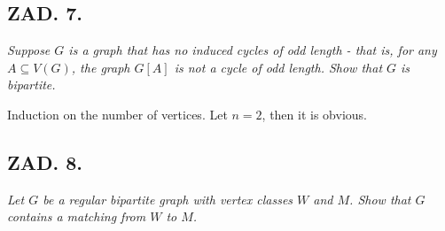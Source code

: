 \documentclass{article}[13pt]
\begin{document}
\subsection*{ZAD. 7.}

\emph{Suppose $G$ is a graph that has no induced cycles of odd length - that is, for any $A\subseteq V(G)$, the graph $G[A]$ is not a cycle of odd length. Show that $G$ is bipartite.}
\medskip

Induction on the number of vertices. Let $n=2$, then it is obvious. 

\subsection*{ZAD. 8.}

\emph{Let $G$ be a regular bipartite graph with vertex classes $W$ and $M$. Show that $G$ contains a matching from $W$ to $M$.}
\medskip
\end{document}
